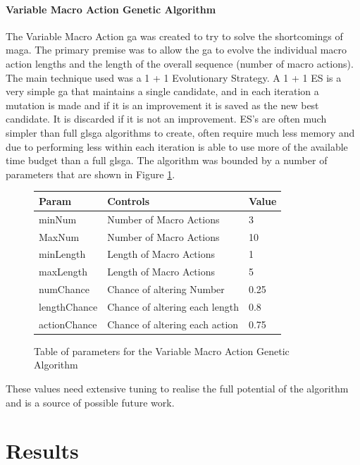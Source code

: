 \documentclass{IEEEtran}
\begin{document}
\paragraph{Variable Macro Action Genetic Algorithm}
The Variable Macro Action \gls{ga} was created to try to solve the shortcomings of \gls{maga}. The primary premise was to allow the \gls{ga} to evolve the individual macro action lengths and the length of the overall sequence (number of macro actions). The main technique used was a 1 + 1 Evolutionary Strategy. A 1 + 1 ES is a very simple \gls{ga} that maintains a single candidate, and in each iteration a mutation is made and if it is an improvement it is saved as the new best candidate. It is discarded if it is not an improvement. ES's are often much simpler than full gls{ga} algorithms to create, often require much less memory and due to performing less within each iteration is able to use more of the available time budget than a full gls{ga}. The algorithm was bounded by a number of parameters that are shown in Figure \ref{vmagaTable}.

\begin{figure}[h]
\centering
\begin{tabular}{| l | l | l |}
\hline
\textbf{Param} & \textbf{Controls} & \textbf{Value} \\
\hline
minNum & Number of Macro Actions & 3 \\
MaxNum & Number of Macro Actions & 10 \\
minLength & Length of Macro Actions & 1 \\
maxLength & Length of Macro Actions & 5 \\
numChance & Chance of altering Number & 0.25 \\
lengthChance & Chance of altering each length & 0.8 \\
actionChance & Chance of altering each action & 0.75 \\
\hline
\end{tabular}
\caption{Table of parameters for the Variable Macro Action Genetic Algorithm}
\label{vmagaTable}
\end{figure}
These values need extensive tuning to realise the full potential of the algorithm and is a source of possible future work.
\pagebreak
\section{Results}
\end{document}
